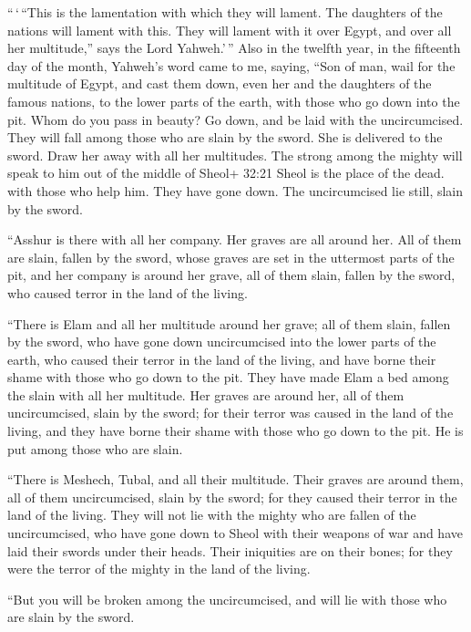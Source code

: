  ``\,`\,``This is the lamentation with which they will
lament. The daughters of the nations will lament with this. They will
lament with it over Egypt, and over all her multitude,'' says the Lord
Yahweh.'\,''  Also in the twelfth year, in the fifteenth
day of the month, Yahweh's word came to me, saying,  ``Son
of man, wail for the multitude of Egypt, and cast them down, even her
and the daughters of the famous nations, to the lower parts of the
earth, with those who go down into the pit.  Whom do you
pass in beauty? Go down, and be laid with the uncircumcised.
 They will fall among those who are slain by the sword. She
is delivered to the sword. Draw her away with all her multitudes.
 The strong among the mighty will speak to him out of the
middle of Sheol+ 32:21 Sheol is the place of the dead. with those who
help him. They have gone down. The uncircumcised lie still, slain by the
sword.

 ``Asshur is there with all her company. Her graves are all
around her. All of them are slain, fallen by the sword, 
whose graves are set in the uttermost parts of the pit, and her company
is around her grave, all of them slain, fallen by the sword, who caused
terror in the land of the living.

 ``There is Elam and all her multitude around her grave;
all of them slain, fallen by the sword, who have gone down uncircumcised
into the lower parts of the earth, who caused their terror in the land
of the living, and have borne their shame with those who go down to the
pit.  They have made Elam a bed among the slain with all
her multitude. Her graves are around her, all of them uncircumcised,
slain by the sword; for their terror was caused in the land of the
living, and they have borne their shame with those who go down to the
pit. He is put among those who are slain.

 ``There is Meshech, Tubal, and all their multitude. Their
graves are around them, all of them uncircumcised, slain by the sword;
for they caused their terror in the land of the living. 
They will not lie with the mighty who are fallen of the uncircumcised,
who have gone down to Sheol with their weapons of war and have laid
their swords under their heads. Their iniquities are on their bones; for
they were the terror of the mighty in the land of the living.

 ``But you will be broken among the uncircumcised, and will
lie with those who are slain by the sword.

